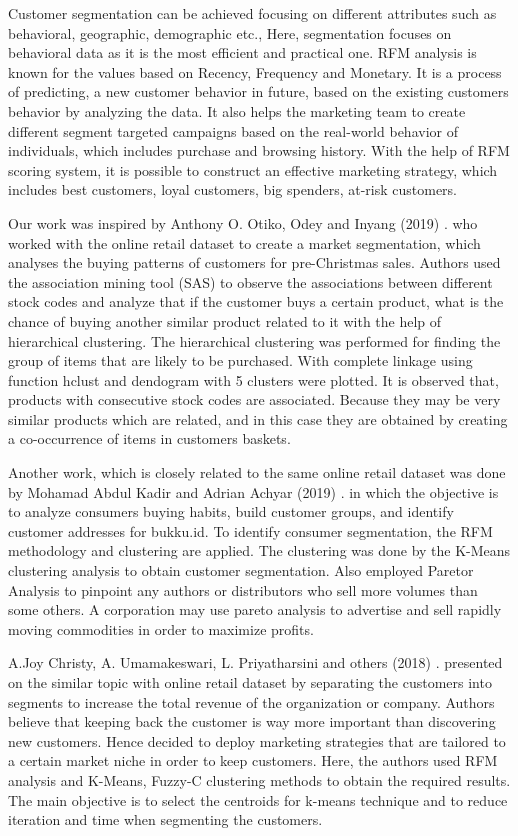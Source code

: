 \documentclass[conference]{IEEEtran}
\begin{document}
Customer segmentation can be achieved focusing on different attributes such as behavioral, geographic, demographic etc., Here, segmentation focuses on behavioral data as it is the most efficient and practical one. RFM analysis is known for the values based on Recency, Frequency and Monetary. It is a process of predicting, a new customer behavior in future, based on the existing customers behavior by analyzing the data. It also helps the marketing team to create different segment targeted campaigns based on the real-world behavior of individuals, which includes purchase and browsing history. With the help of RFM scoring system, it is possible to construct an effective marketing strategy, which includes best customers, loyal customers, big spenders, at-risk customers. 

Our work was inspired by Anthony O. Otiko, Odey and Inyang (2019) \cite{b1}. who worked with the online retail dataset to create a market segmentation, which analyses the buying patterns of customers for pre-Christmas sales. Authors used the association mining tool (SAS) to observe the associations between different stock codes and analyze that if the customer buys a certain product, what is the chance of buying another similar product related to it with the help of hierarchical clustering. The hierarchical clustering was performed for finding the group of items that are likely to be purchased. With complete linkage using function hclust and dendogram with 5 clusters were plotted. It is observed that, products with consecutive stock codes are associated. Because they may be very similar products which are related, and in this case they are obtained by creating a co-occurrence of items in customers baskets.

Another work, which is closely related to the same online retail dataset was done by Mohamad Abdul Kadir and Adrian Achyar (2019) \cite{b2}. in which the objective is to analyze consumers buying habits, build customer groups, and identify customer addresses for bukku.id. To identify consumer segmentation, the RFM methodology and clustering are applied. The clustering was done by the K-Means clustering analysis to obtain customer segmentation. Also employed Paretor Analysis to pinpoint any authors or distributors who sell more volumes than some others. A corporation may use pareto analysis to advertise and sell rapidly moving commodities in order to maximize profits. 

A.Joy Christy, A. Umamakeswari, L. Priyatharsini and others (2018) \cite{b3}. presented on the similar topic with online retail dataset by separating the customers into segments to increase the total revenue of the organization or company. Authors believe that keeping back the customer is way more important than discovering new customers. Hence decided to deploy marketing strategies that are tailored to a certain market niche in order to keep customers. Here, the authors used RFM analysis and K-Means, Fuzzy-C clustering methods to obtain the required results. The main objective is to select the centroids for k-means technique and to reduce iteration and time when segmenting the customers.
\end{document}
